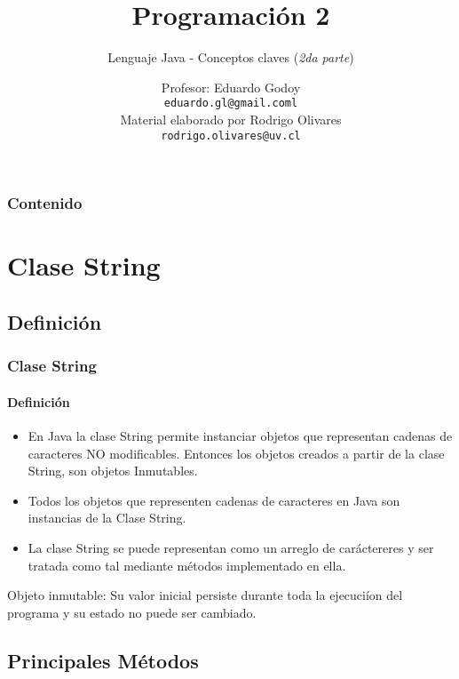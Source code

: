 \documentclass{beamer}
\title[\textbf{Programaci\'on 2}]{\textbf{Programaci\'on 2}}
\subtitle{Lenguaje Java - Conceptos claves (\emph{2da parte})}
\author[Eduardo Godoy]
{
	Profesor: Eduardo Godoy \\
	\vspace{0.5mm}
	\texttt{\normalsize eduardo.gl@gmail.coml} \\ 
	Material elaborado por Rodrigo Olivares \\
	\texttt{\normalsize rodrigo.olivares@uv.cl} 
}
\institute[Universidad de Valpara\'iso]
\begin{document}
	\begin{frame}
		\titlepage
	\end{frame}

	\begin{frame}
		\frametitle{Contenido}
		\tableofcontents%
	\end{frame}


    \section{Clase String}
 		   \subsection{Definici\'on}
		  \begin{frame}
			\frametitle{Clase String}
			\framesubtitle{Definici\'on}
  			\begin{block}{}
 				\begin{itemize}
 					\item En Java la clase  String permite instanciar objetos que representan  cadenas de caracteres  NO modificables. Entonces los objetos creados a partir de la clase String, son objetos Inmutables.
\item   Todos los objetos que representen cadenas de caracteres en Java son instancias de la Clase String.
\item La clase String se puede representan como un arreglo de car\'actereres y ser tratada como tal mediante m\'etodos implementado en ella.
				 \end{itemize}
			\end{block}
\begin{block}{}
Objeto inmutable:
Su valor inicial persiste durante toda la ejecuci\'ion  del programa y su estado no puede ser cambiado.
\end{block}
		\end{frame}
		\subsection{Principales M\'etodos}
\end{document}
